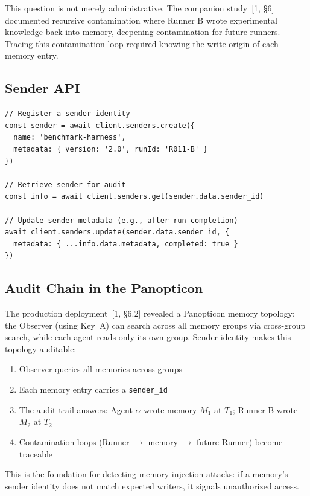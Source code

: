\documentclass[11pt, a4paper]{article}
\begin{document}
This question is not merely administrative. The companion study~[1, \S6] documented recursive contamination where Runner B wrote experimental knowledge back into memory, deepening contamination for future runners. Tracing this contamination loop required knowing the write origin of each memory entry.

\subsection{Sender API}

\begin{lstlisting}[caption={Sender identity management (from \texttt{everos.ts}:247--258)}]
// Register a sender identity
const sender = await client.senders.create({
  name: 'benchmark-harness',
  metadata: { version: '2.0', runId: 'R011-B' }
})

// Retrieve sender for audit
const info = await client.senders.get(sender.data.sender_id)

// Update sender metadata (e.g., after run completion)
await client.senders.update(sender.data.sender_id, {
  metadata: { ...info.data.metadata, completed: true }
})
\end{lstlisting}

\subsection{Audit Chain in the Panopticon}

The production deployment~[1, \S6.2] revealed a Panopticon memory topology: the Observer (using Key~A) can search across all memory groups via cross-group search, while each agent reads only its own group. Sender identity makes this topology auditable:

\begin{enumerate}[nosep]
  \item Observer queries all memories across groups
  \item Each memory entry carries a \texttt{sender\_id}
  \item The audit trail answers: Agent-$\alpha$ wrote memory $M_1$ at $T_1$; Runner B wrote $M_2$ at $T_2$
  \item Contamination loops (Runner $\to$ memory $\to$ future Runner) become traceable
\end{enumerate}

This is the foundation for detecting memory injection attacks: if a memory's sender identity does not match expected writers, it signals unauthorized access.
\end{document}
